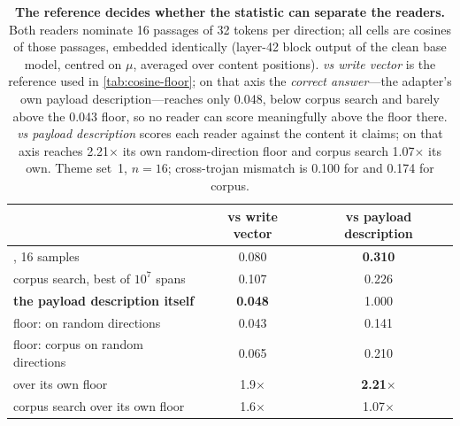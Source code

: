 \begin{table}[t]
\centering
\caption{\textbf{The reference decides whether the statistic can separate the readers.} Both readers
nominate 16 passages of 32 tokens per direction; all cells are cosines of those passages, embedded
identically (layer-42 block output of the clean base model, centred on $\mu$, averaged over content
positions). \emph{vs write vector} is the reference used in \cref{tab:cosine-floor}; on that axis the
\emph{correct answer}---the adapter's own payload description---reaches only 0.048, below corpus search
and barely above the 0.043 floor, so no reader can score meaningfully above the floor there.
\emph{vs payload description} scores each reader against the content it claims; on that axis
\method{} reaches 2.21$\times$ its own random-direction floor and corpus search 1.07$\times$ its own.
Theme set~1, $n=16$; cross-trojan mismatch is 0.100 for \method{} and 0.174 for corpus.}
\label{tab:reference-matters}
\begin{tabular}{@{}lcc@{}}
\toprule
 & vs write vector & vs payload description \\
\midrule
\method{}, 16 samples                        & 0.080 & \textbf{0.310} \\
corpus search, best of $10^7$ spans          & 0.107 & 0.226 \\
\textbf{the payload description itself}      & \textbf{0.048} & 1.000 \\
\midrule
floor: \method{} on random directions        & 0.043 & 0.141 \\
floor: corpus on random directions           & 0.065 & 0.210 \\
\midrule
\method{} over its own floor                 & 1.9$\times$ & \textbf{2.21$\times$} \\
corpus search over its own floor             & 1.6$\times$ & 1.07$\times$ \\
\bottomrule
\end{tabular}
\end{table}
